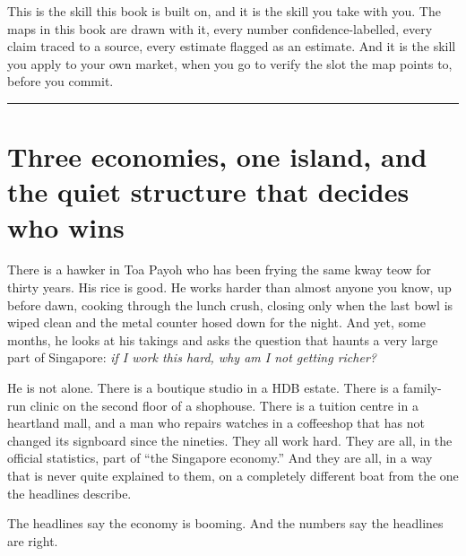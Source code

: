 \documentclass[10pt,twoside,openany]{memoir}
\begin{document}
This is the skill this book is built on, and it is the skill you take
with you. The maps in this book are drawn with it, every number
confidence-labelled, every claim traced to a source, every estimate
flagged as an estimate. And it is the skill you apply to your own
market, when you go to verify the slot the map points to, before you
commit.

\begin{center}\rule{0.5\linewidth}{0.5pt}\end{center}

\FloatBarrier
\chapter{Three economies, one island, and the quiet structure that
decides who
wins}\label{three-economies-one-island-and-the-quiet-structure-that-decides-who-wins}

There is a hawker in Toa Payoh who has been frying the same kway teow
for thirty years. His rice is good. He works harder than almost anyone
you know, up before dawn, cooking through the lunch crush, closing only
when the last bowl is wiped clean and the metal counter hosed down for
the night. And yet, some months, he looks at his takings and asks the
question that haunts a very large part of Singapore: \emph{if I work
this hard, why am I not getting richer?}

He is not alone. There is a boutique studio in a HDB estate. There is a
family-run clinic on the second floor of a shophouse. There is a tuition
centre in a heartland mall, and a man who repairs watches in a
coffeeshop that has not changed its signboard since the nineties. They
all work hard. They are all, in the official statistics, part of ``the
Singapore economy.'' And they are all, in a way that is never quite
explained to them, on a completely different boat from the one the
headlines describe.

The headlines say the economy is booming. And the numbers say the
headlines are right.
\end{document}
